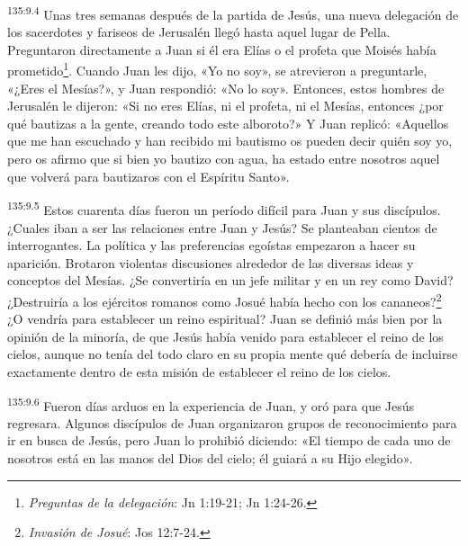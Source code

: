 \par 
\textsuperscript{135:9.4} Unas tres semanas después de la partida de Jesús, una nueva delegación de los sacerdotes y fariseos de Jerusalén llegó hasta aquel lugar de Pella. Preguntaron directamente a Juan si él era Elías o el profeta que Moisés había prometido\footnote{\textit{Preguntas de la delegación}: Jn 1:19-21; Jn 1:24-26.}. Cuando Juan les dijo, «Yo no soy», se atrevieron a preguntarle, «¿Eres el Mesías?», y Juan respondió: «No lo soy». Entonces, estos hombres de Jerusalén le dijeron: «Si no eres Elías, ni el profeta, ni el Mesías, entonces ¿por qué bautizas a la gente, creando todo este alboroto?» Y Juan replicó: «Aquellos que me han escuchado y han recibido mi bautismo os pueden decir quién soy yo, pero os afirmo que si bien yo bautizo con agua, ha estado entre nosotros aquel que volverá para bautizaros con el Espíritu Santo».

\par 
\textsuperscript{135:9.5} Estos cuarenta días fueron un período difícil para Juan y sus discípulos. ¿Cuales iban a ser las relaciones entre Juan y Jesús? Se planteaban cientos de interrogantes. La política y las preferencias egoístas empezaron a hacer su aparición. Brotaron violentas discusiones alrededor de las diversas ideas y conceptos del Mesías. ¿Se convertiría en un jefe militar y en un rey como David? ¿Destruiría a los ejércitos romanos como Josué había hecho con los cananeos?\footnote{\textit{Invasión de Josué}: Jos 12:7-24.} ¿O vendría para establecer un reino espiritual? Juan se definió más bien por la opinión de la minoría, de que Jesús había venido para establecer el reino de los cielos, aunque no tenía del todo claro en su propia mente qué debería de incluirse exactamente dentro de esta misión de establecer el reino de los cielos.

\par 
\textsuperscript{135:9.6} Fueron días arduos en la experiencia de Juan, y oró para que Jesús regresara. Algunos discípulos de Juan organizaron grupos de reconocimiento para ir en busca de Jesús, pero Juan lo prohibió diciendo: «El tiempo de cada uno de nosotros está en las manos del Dios del cielo; él guiará a su Hijo elegido».

